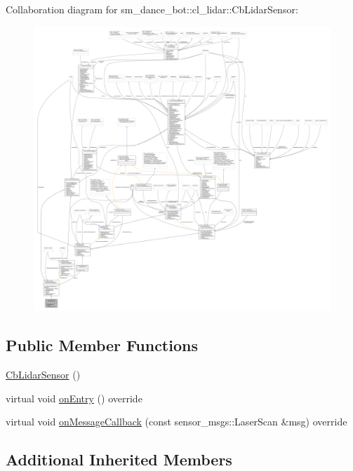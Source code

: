 Collaboration diagram for sm\+\_\+dance\+\_\+bot\+:\+:cl\+\_\+lidar\+:\+:Cb\+Lidar\+Sensor\+:
\nopagebreak
\begin{figure}[H]
\begin{center}
\leavevmode
\includegraphics[width=350pt]{structsm__dance__bot_1_1cl__lidar_1_1CbLidarSensor__coll__graph}
\end{center}
\end{figure}
\subsection*{Public Member Functions}
\begin{DoxyCompactItemize}
\item 
\hyperlink{structsm__dance__bot_1_1cl__lidar_1_1CbLidarSensor_ab1a62a26b0d3dc6f4014bb15db0aa218}{Cb\+Lidar\+Sensor} ()
\item 
virtual void \hyperlink{structsm__dance__bot_1_1cl__lidar_1_1CbLidarSensor_aad3468a6ae78999c9fd01bdb81b42a49}{on\+Entry} () override
\item 
virtual void \hyperlink{structsm__dance__bot_1_1cl__lidar_1_1CbLidarSensor_a9f9cc01c88137995883845178eb0bed0}{on\+Message\+Callback} (const sensor\+\_\+msgs\+::\+Laser\+Scan \&msg) override
\end{DoxyCompactItemize}
\subsection*{Additional Inherited Members}



